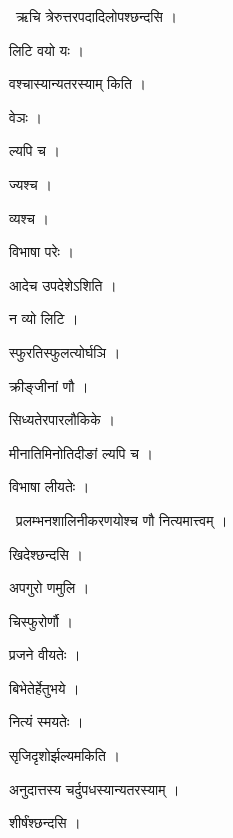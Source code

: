 \documentclass[10pt, openany, oneside]{book}
\begin{document}
\par\noindent\hspace{1.5em}{\vps वा॰}~{\qt ऋचि त्रेरुत्तरपदादिलोपश्छन्दसि ।}

\noindent लिटि वयो यः ।

\noindent वश्चास्यान्यतरस्याम् किति ।

\noindent वेञः ।

\noindent ल्यपि च ।

\noindent ज्यश्च ।

\noindent व्यश्च ।

\noindent विभाषा परेः ।

\noindent आदेच उपदेशेऽशिति ।

\noindent न व्यो लिटि ।

\noindent स्फुरतिस्फुलत्योर्घञि ।

\noindent क्रीङ्जीनां णौ ।

\noindent सिध्यतेरपारलौकिके ।

\noindent मीनातिमिनोतिदीङां ल्यपि च ।

\noindent विभाषा लीयतेः ।

\par\noindent\hspace{1.5em}{\vps वा॰}~{\qt प्रलम्भनशालिनीकरणयोश्च णौ नित्यमात्त्वम् ।}

\noindent खिदेश्छन्दसि ।

\noindent अपगुरो णमुलि ।

\noindent चिस्फुरोर्णौ ।

\noindent प्रजने वीयतेः ।

\noindent बिभेतेर्हेतुभये ।

\noindent नित्यं स्मयतेः ।

\noindent सृजिदृशोर्झल्यमकिति ।

\noindent अनुदात्तस्य चर्दुपधस्यान्यतरस्याम् ।

\noindent शीर्षंश्छन्दसि ।
\end{document}
